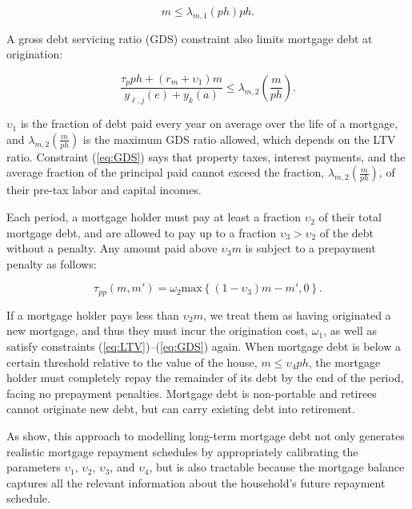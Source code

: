 \documentclass[parskip=full]{article}
\begin{document}
\begin{equation}\label{eq:LTV}
m \leq \lambda_{m,1}(ph) p h.
\end{equation}

\noindent A gross debt servicing ratio (GDS) constraint also limits mortgage debt at origination: 

\begin{equation}\label{eq:GDS}
\frac{\tau_{p}ph+(r_{m}+\upsilon_{1})m}{y_{\ell,j}(e)+y_{k}(a)} \leq \lambda_{m,2}\left(\frac{m}{ph}\right).
\end{equation}

\noindent $\upsilon_{1}$ is the fraction of debt paid every year on average over the life of a mortgage, and $\lambda_{m,2}\left(\frac{m}{ph}\right)$ is the maximum GDS ratio allowed, which depends on the LTV ratio. Constraint (\ref{eq:GDS}) says that property taxes, interest payments, and the average fraction of the principal paid cannot exceed the fraction, $\lambda_{m,2}\left(\frac{m}{ph}\right)$, of their pre-tax labor and capital incomes. 

Each period, a mortgage holder must pay at least a fraction $\upsilon_{2}$ of their total mortgage debt, and are allowed to pay up to a fraction $\upsilon_{3}>\upsilon_{2}$ of the debt without a penalty. Any amount paid above $\upsilon_{3}m$ is subject to a prepayment penalty as follows: 

\begin{equation}\label{eq:prepayment_penalty}
\tau_{pp}(m,m')=\omega_{2}\mbox{max}\left\{(1-\upsilon_{3})m-m',0\right\}.
\end{equation}

\noindent If a mortgage holder pays less than $\upsilon_{2}m$, we treat them as having originated a new mortgage, and thus they must incur the origination cost, $\omega_{1}$, as well as satisfy constraints (\ref{eq:LTV})--(\ref{eq:GDS}) again. When mortgage debt is below a certain threshold relative to the value of the house, $m \leq \upsilon_{4}ph$, the mortgage holder must completely repay the remainder of its debt by the end of the period, facing no prepayment penalties. Mortgage debt is non-portable and retirees cannot originate new debt, but can carry existing debt into retirement.

As \citet{rs-2023} show, this approach to modelling long-term mortgage debt not only generates realistic mortgage repayment schedules by appropriately calibrating the parameters $\upsilon_1$, $\upsilon_2$, $\upsilon_3$, and $\upsilon_4$, but is also tractable because the mortgage balance captures all the relevant information about the household's future repayment schedule.
\end{document}
